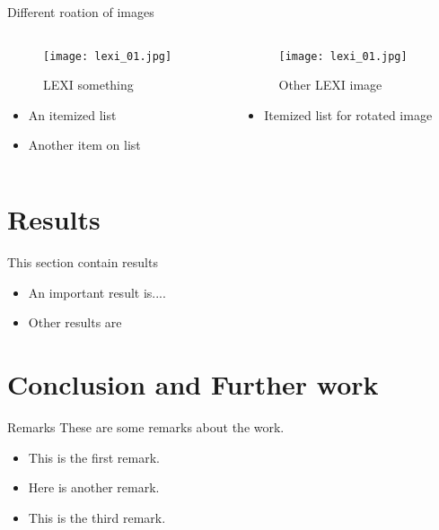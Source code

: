 \documentclass[10pt,xcolor=table]{beamer}
\begin{document}
    \begin{frame}{Different roation of images}
        \begin{columns}
            \begin{column}{0.5\textwidth}
                \begin{figure}
                    \texttt{[image: lexi\_01.jpg]}
                    \caption{LEXI something}
                \end{figure}
                \begin{itemize}
                    \item An itemized list
                    \item Another item on list
                \end{itemize}
            \end{column}
            \begin{column}{0.5\textwidth}
                \begin{figure}
                    \texttt{[image: lexi\_01.jpg]}
                    \caption{Other LEXI image}
                \end{figure}
                \begin{itemize}
                    \item Itemized list for rotated image
                \end{itemize}
            \end{column}
            \vspace{0.25cm}
        \end{columns}
    \end{frame}

\section{Results}
    \begin{frame}{This section contain results}
        \begin{itemize}
            \item An important result is....
            \item Other results are 
        \end{itemize}  
    \end{frame}

    \section[Conclusion]{Conclusion and Further work}
    \begin{frame}{Remarks}
        These are some remarks about the work.
        \begin{itemize}
            \item This is the first remark.
            \item Here is another remark.
            \item This is the third remark.
        \end{itemize}
    \end{frame}
\end{document}
